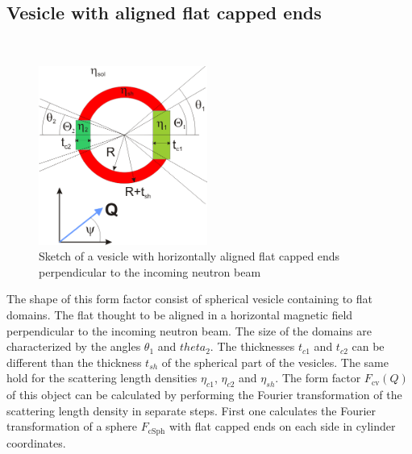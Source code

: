 \clearpage
\subsection{Vesicle with aligned flat capped ends \cite{Kaya:aj5008,Kaya:aj5016}}
\label{sect:vesicle_capped_poles_aligned} ~\\

\begin{figure}[htb]
\begin{center}
\includegraphics[width=0.492\textwidth]{vesicle_capped_poles_aligned.png}
\end{center}
\caption{Sketch of a vesicle with horizontally aligned flat
capped ends perpendicular to the incoming neutron beam}
\label{fig:Sketch_vesicle_capped_poles_aligned}
\end{figure}
The shape of this form factor consist of spherical vesicle containing to flat domains.
The flat thought to be aligned in a horizontal magnetic field perpendicular to the incoming
neutron beam. The size of the domains are characterized by the angles $\theta_1$ and
$theta_2$. The thicknesses $t_{c1}$ and $t_{c2}$ can be different than the thickness $t_{sh}$
of the spherical part of the vesicles. The same hold for the scattering length densities
$\eta_{c1}$, $\eta_{c2}$ and $\eta_{sh}$. The form factor $F_\text{cv}(Q)$ of this object can be
calculated by performing the Fourier transformation of the scattering length density in separate
steps. First one calculates the Fourier transformation of a sphere $F_\text{cSph}$
with flat capped ends on each side in cylinder coordinates.
